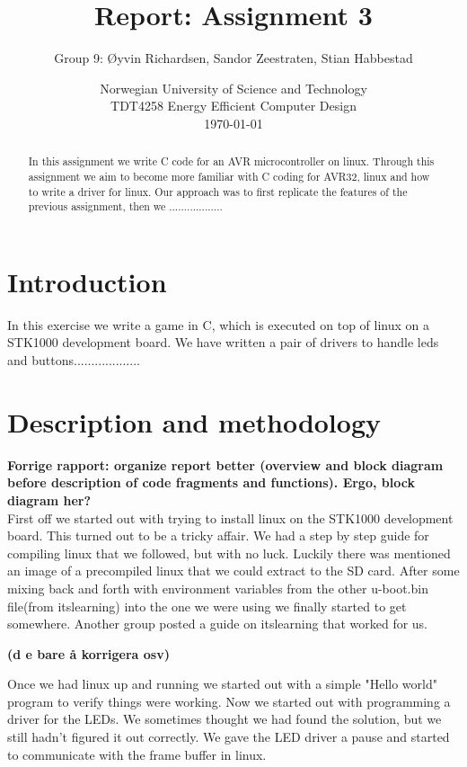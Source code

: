 \documentclass[a4paper,11pt]{article}
\title{\textbf{Report: Assignment 3}}
\author{Group 9: \O yvin Richardsen, Sandor Zeestraten, Stian Habbestad}
\date{{Norwegian University of Science and Technology \\
TDT4258 Energy Efficient Computer Design \\}
\today}
\begin{document}
\maketitle

\begin{abstract}
In this assignment we write C code for an AVR microcontroller on linux. Through this assignment we aim to become more familiar with C coding for AVR32, linux and how to write a driver for linux. Our approach was to first replicate the features of the previous assignment, then we ..................
\end{abstract}

\bigskip
\tableofcontents
\newpage

\section{Introduction}

In this exercise we write a game in C, which is executed on top of linux on a STK1000 development board. We have written a pair of drivers to handle leds and buttons...................

\section{Description and methodology}

\textbf{Forrige rapport: organize report better (overview and block diagram before description of code fragments and functions). Ergo, block diagram her?}\\

First off we started out with trying to install linux on the STK1000 development board. This turned out to be a tricky affair. We had a step by step guide for compiling linux that we followed, but with no luck. Luckily there was mentioned an image of a precompiled linux that we could extract to the SD card. After some mixing back and forth with environment variables from the other u-boot.bin file(from itslearning) into the one we were using we finally started to get somewhere. Another group posted a guide on itslearning that worked for us.

\textbf{(d e bare å korrigera osv) }

Once we had linux up and running we started out with a simple "Hello world" program to verify things were working. Now we started out with programming a driver for the LEDs. We sometimes thought we had found the solution, but we still hadn't figured it out correctly. We gave the LED driver a pause and started to communicate with the frame buffer in linux. 
\end{document}
